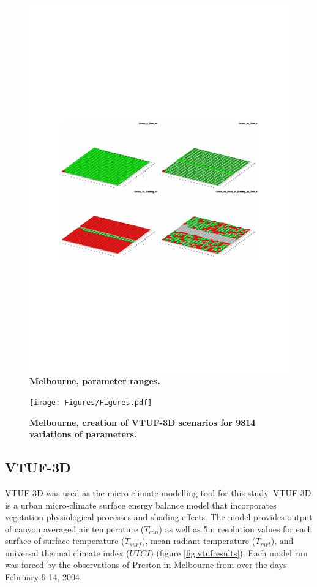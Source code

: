 \documentclass[final,3p,times,authoryear]{elsarticle}
\begin{document}
\begin{figure}
\centering
\includegraphics[page=3,trim={55 240 60 240},clip,scale=0.65]{Figures/PresentationImages.pdf}
\caption{\bf Melbourne, parameter ranges.}
\end{figure} 

\begin{figure}
\centering
\texttt{[image: Figures/Figures.pdf]}
\caption{\bf Melbourne, creation of VTUF-3D scenarios for 9814 variations of parameters.}
 \label{fig:scenarios}
\end{figure} 






\subsection{VTUF-3D}\label{sec:methodsvtuf}
VTUF-3D \citep{Nice2018a} was used as the micro-climate modelling tool for this study. VTUF-3D is a urban micro-climate surface energy balance model that incorporates vegetation physiological processes and shading effects. The model provides output of canyon averaged air temperature ($T_{can}$) as well as 5m resolution values for each surface of surface temperature ($T_{surf}$), mean radiant temperature ($T_{mrt}$), and universal thermal climate index ($UTCI$) (figure \ref{fig:vtufresults}). Each model run was forced by the observations of Preston in Melbourne from \cite{Coutts2007} over the days February 9-14, 2004. 
\end{document}
